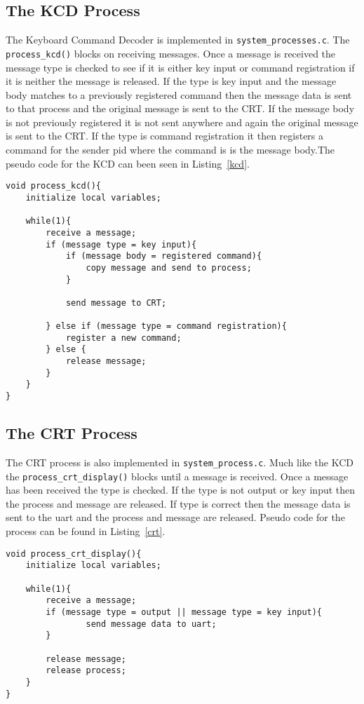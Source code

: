 \documentclass[oneside]{article}
\begin{document}
\subsection*{The KCD Process}
The Keyboard Command Decoder is implemented in \texttt{system\_processes.c}. The 
\texttt{process\_kcd()} blocks on receiving messages. Once a message is received the 
message type is checked to see if it is either key input or command registration if it 
is neither the message is released. If the type is key input and the message body matches 
to a previously registered command then the message data is sent to that process and the 
original message is sent to the CRT. If the message body is not previously registered it 
is not sent anywhere and again the original message is sent to the CRT. If the type is 
command registration it then registers a command for the sender pid where the command is 
is the message body.The pseudo code for the KCD can been seen in Listing~\ref{kcd}. 

\begin{lstlisting}
void process_kcd(){
    initialize local variables;

    while(1){
        receive a message;
        if (message type = key input){
            if (message body = registered command){
                copy message and send to process;
            }
        
            send message to CRT;    

        } else if (message type = command registration){
            register a new command;
        } else {
            release message;
        }
    }
}
\end{lstlisting}

\subsection*{The CRT Process}
The CRT process is also implemented in \texttt{system\_process.c}. Much like the KCD 
the \texttt{process\_crt\_display()} blocks until a message is received. Once a message 
has been received the type is checked. If the type is not output or key input then 
the process and message are released. If type is correct then the message data is sent to 
the uart and the process and message are released. Pseudo code for the process can be found 
in Listing~\ref{crt}.

\begin{lstlisting}
void process_crt_display(){
    initialize local variables;

    while(1){
        receive a message;
        if (message type = output || message type = key input){
                send message data to uart;
        }
        
        release message;
        release process;
    }
}
\end{lstlisting}
\end{document}
